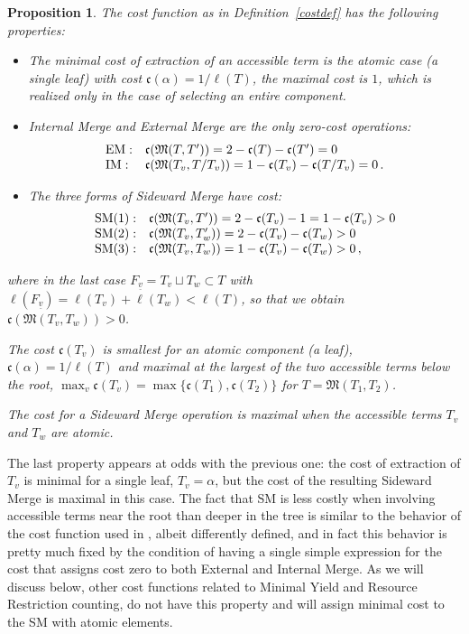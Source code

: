 \documentclass[12pt]{amsart}
\newtheorem{prop}{Proposition}[section]
\numberwithin{equation}{section}
\def\fM{{\mathfrak M}}
\def\fc{{\mathfrak c}}
\begin{document}
  \begin{prop}\label{MSprop}
  The cost function as in Definition~\ref{costdef} has the following properties:
  \begin{itemize}
  \item The minimal cost of extraction of an accessible term is the atomic case (a single leaf) with
  cost $\fc(\alpha)=1/\ell(T)$, the maximal cost is $1$, which is realized only in the case
  of selecting an entire component.
  \item Internal Merge and External Merge are the only zero-cost operations:
  $$ \begin{array}{ll} {\bf {\rm EM}}: &  \fc(\fM(T,T'))=2-\fc(T)-\fc(T')=0 \\  
  {\bf {\rm IM}}: & \fc(\fM(T_v,T/T_v))=1-\fc(T_v)-\fc(T/T_v) =0 \, .  \end{array} $$
  \item The three forms of Sideward Merge have cost:
  $$ \begin{array}{ll} {\bf {\rm SM(1)}}: &    \fc(\fM(T_v,T'))=2-\fc(T_v)-1=1- \fc(T_v) > 0    \\ 
   {\bf {\rm SM(2)}}: &  \fc(\fM(T_v, T'_w)) = 2 -\fc(T_v) - \fc(T_w) >0  \\  
  {\bf {\rm SM(3)}}:  & \fc(\fM(T_v, T_w)) = 1 -\fc(T_v) - \fc(T_w) >0 \, ,  \end{array} $$
  \end{itemize}
  where in the last case $F_{\underline{v}}=T_v\sqcup T_w \subset T$ with $\ell(F_{\underline{v}})=\ell(T_v)+\ell(T_w) < \ell(T)$,
  so that we obtain $\fc(\fM(T_v, T_w)) >0$. 
  \item The cost $\fc(T_v)$ is smallest for an atomic component (a leaf), $\fc(\alpha)=1/\ell(T)$ and maximal at the
  largest of the two accessible terms below the root, $\max_v \fc(T_v)=\max\{ \fc(T_1), \fc(T_2) \}$ for $T=\fM(T_1,T_2)$.
  \item The cost for a Sideward Merge operation is maximal when the accessible terms $T_v$ and $T_w$ are atomic.
  \end{prop}
  
  The last property appears at odds with the previous one: the cost of extraction of $T_v$ is minimal for a single
  leaf, $T_v=\alpha$, but the cost of the resulting Sideward Merge is maximal in this case. The fact that
  SM is less costly when involving accessible terms near the root than deeper in the tree is similar
  to the behavior of the cost function used in \cite{MCB}, albeit differently defined, and in fact this
  behavior is pretty much fixed by the condition of having a single simple expression for the
  cost that assigns cost zero to both External and Internal Merge. As we will discuss below, other cost
  functions related to Minimal Yield and Resource Restriction counting, do not have this property and
  will assign minimal cost to the SM with atomic elements. 
  
\end{document}
